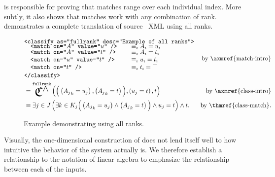 is responsible for proving that matches range over each
  individual index.
More subtly,
  it also shows that matches work with any combination of rank.
 demonstrates a complete translation of
  source \tame{}~XML using all ranks.

\begin{figure}[ht]
\begin{align}
  &\begin{aligned}
    &\xml{<classify as="fullrank" desc="Example of all ranks">} \xmlnl
    &\quad\begin{aligned}
      &\xml{<match on="$A$" value="$u$" />}
        \quad&&\equivish \varsub A = \varsub u \\[-2mm]
      &\xml{<match on="$A$" value="$t$" />}
        \quad&&\equivish \varsub A = \varsub t \xmlnll
      &\xml{<match on="$u$" value="$t$" />}
        \quad&&\equivish \varsub u = \varsub t \xmlnll
      &\xml{<match on="$t$" />}
        \quad&&\equivish \varsub t = \true
    \end{aligned} \xmlnll
    &\xml{</classify>}
  \end{aligned}
    &\text{by \axmref{match-intro}} \\
  &= \Classifyland^\texttt{fullrank}\left(
       \Big(\left({A_j}_k = u_j\right),
             \left({A_j}_k = t \right)
       \Big),
       \left(u_j = t\right),
       t
     \right)
    &\text{by \axmref{class-intro}} \\
  &\equiv \Exists{j\in J}{
            \Exists*{k\in K_j}{\Big(
              \left({A_j}_k = u_j\right)
              \land \left({A_j}_k = t \right)
            \Big)}
            \land u_j = t
          }
          \land t.
    &\text{by \thmref{class-match}}.
\end{align}
\caption{Example demonstrating  using all ranks.}
\label{f:ex:class-match-all-ranks}
\end{figure}

Visually,
  the one-dimensional construction of  does not lend
  itself well to how intuitive the behavior of the system actually is.
We therefore establish a relationship to the notation of linear algebra
  to emphasize the relationship between each of the inputs.

\newcommand\matseqsup[1]{%
  \begin{bmatrix}
    M^{#1}_{0_0} & \dots  & M^{#1}_{0_k} \\
    \vdots       & \ddots & \vdots \\
    M^{#1}_{j_0} & \dots  & M^{#1}_{j_k} \\
  \end{bmatrix}%
}
\newcommand\vecseqsup[1]{%
  \begin{bmatrix}
    v^{#1}_0 \\
    \vdots       \\
    v^{#1}_j \\
  \end{bmatrix}%
}

